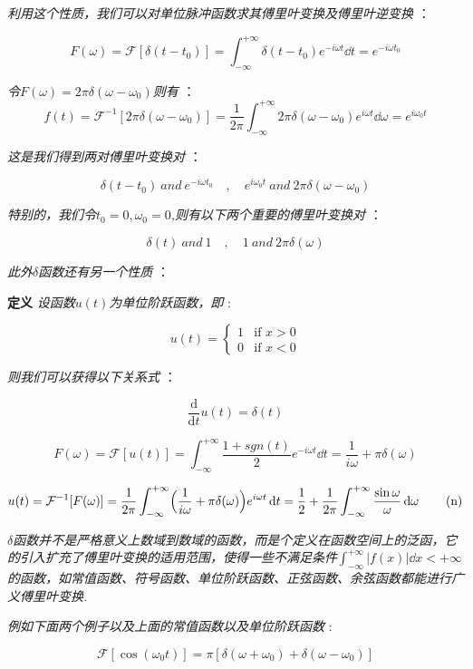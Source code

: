 \textit{利用这个性质，我们可以对单位脉冲函数求其傅里叶变换及傅里叶逆变换} ：

\[F(\omega)=\mathcal{F}[\delta(t-t_0)]=\int_{-\infty}^{+\infty}\delta(t-t_0)e^{-i\omega t}\dd{t}=e^{-i\omega t_0}\]

\textit{令$F(\omega)=2\pi \delta(\omega-\omega_0)$则有} ： 
\[f(t)=\mathcal{F}^{-1}[2\pi \delta(\omega-\omega_0)]=\frac{1}{2\pi}\int_{-\infty}^{+\infty}2\pi \delta(\omega-\omega_0)e^{i\omega t}\dd{\omega}=e^{i\omega_0 t}\]

\textit{这是我们得到两对傅里叶变换对} ：

\[\delta(t-t_0) \ and \ e^{-i\omega t_0} \quad,\quad e^{i\omega_0 t} \ and \ 2\pi \delta(\omega-\omega_0) \tag{l}\]

\textit{特别的，我们令$t_0=0,\omega_0=0$,则有以下两个重要的傅里叶变换对} ：

\[\delta(t) \ and \ 1 \quad,\quad 1 \ and \ 2\pi \delta(\omega) \tag{m}\]

\textit{此外$\delta$函数还有另一个性质} ：

\textbf{定义} \qquad \textit{设函数$u(t)$为单位阶跃函数，即} :

\[u(t)=\left\{ \begin{array}{rl}
1 & \text{if } x>0 \\
0 & \text{if } x<0 
\end{array} \right. \]

\textit{则我们可以获得以下关系式 }：

\[\frac{\mathrm{d}}{\mathrm{d} t}u(t)=\delta(t)\]

\[F(\omega)=\mathcal{F}[u(t)]=\int_{-\infty}^{+\infty}\frac{1+sgn(t)}{2}e^{-i\omega t}\dd{t}=\frac{1}{i\omega}+\pi\delta(\omega)\]

\[u(t)=\mathcal{F}^{-1}[F(\omega)]=\frac{1}{2\pi}\int_{-\infty}^{+\infty}\Bigl(\frac{1}{i\omega}+\pi\delta(\omega) \Bigl)e^{i\omega t}\dd{t}=\frac{1}{2}+\frac{1}{2\pi}\int_{-\infty}^{+\infty}\frac{\sin\omega}{\omega}\dd{\omega} \tag{n}\]

\textit{$\delta$函数并不是严格意义上数域到数域的函数，而是个定义在函数空间上的泛函，它的引入扩充了傅里叶变换的适用范围，使得一些不满足条件$\int_{-\infty}^{+\infty}|f(x)|\dd{x}<+\infty$的函数，如常值函数、符号函数、单位阶跃函数、正弦函数、余弦函数都能进行广义傅里叶变换.}

\textit{例如下面两个例子以及上面的常值函数以及单位阶跃函数 }:

\[\mathcal{F}[\cos(\omega_0t)]=\pi[\delta(\omega+\omega_0)+\delta(\omega-\omega_0)] \tag{o1}\]

